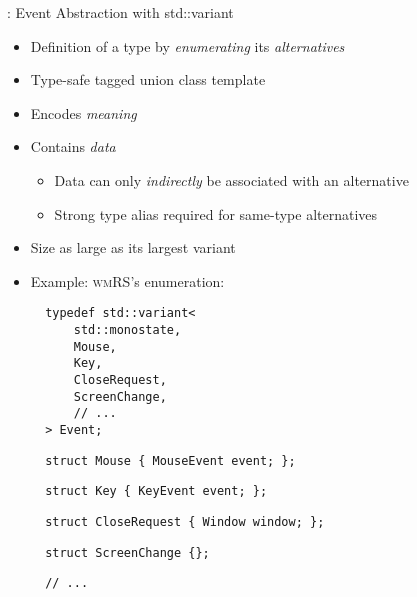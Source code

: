 \begin{frame}[c,fragile]{\underline{\cpp}: Event Abstraction with std::variant \hfill {\footnotesize \currentname}}


    \begin{itemize}

        \item Definition of a type by \textit{enumerating} its \textit{alternatives}

        \item Type-safe tagged union class template

        \item Encodes \textit{meaning}

        \item Contains \textit{data}
            \begin{itemize}
                \item Data can only \textit{indirectly} be associated with an alternative
                \item Strong type alias required for same-type alternatives
            \end{itemize}

        \item Size as large as its largest variant

        \item Example: \textsc{wmRS}'s  enumeration:\\
\begin{minipage}[t]{.45\linewidth}
\begin{verbatim}
  typedef std::variant<
      std::monostate,
      Mouse,
      Key,
      CloseRequest,
      ScreenChange,
      // ...
  > Event;
\end{verbatim}
\end{minipage}%
\begin{minipage}[t]{.45\linewidth}
\begin{verbatim}
  struct Mouse { MouseEvent event; };
\end{verbatim}
\begin{verbatim}
  struct Key { KeyEvent event; };
\end{verbatim}
\begin{verbatim}
  struct CloseRequest { Window window; };
\end{verbatim}
\begin{verbatim}
  struct ScreenChange {};
\end{verbatim}
\begin{verbatim}
  // ...
\end{verbatim}
\end{minipage}

    \end{itemize}

    \vfill

\end{frame}

